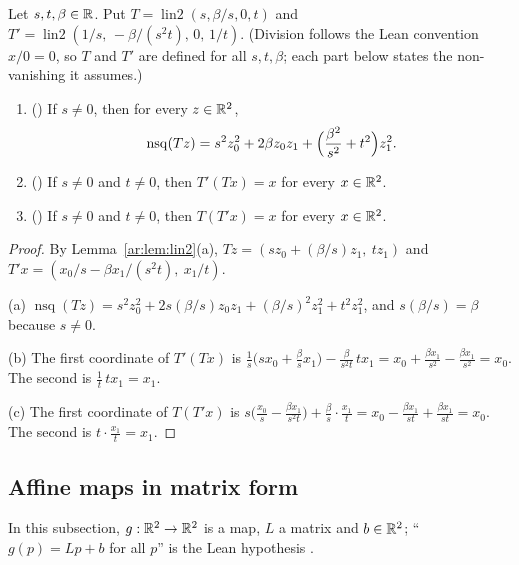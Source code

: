 \begin{lemma}\label{ar:lem:chol}
Let $s,t,\beta\in\mathbb R$. Put $T=\operatorname{lin2}(s,\beta/s,0,t)$ and $T'=\operatorname{lin2}(1/s,\,-\beta/(s^2t),\,0,\,1/t)$.
\textup(Division follows the Lean convention $x/0=0$, so $T$ and $T'$ are defined for all $s,t,\beta$; each part
below states the non-vanishing it assumes.\textup)
\begin{enumerate}[label=\textup{(\alph*)}]
\item \textup{(}\textup{)} If $s\ne0$, then for every $z\in\mathbb R^2$,
\[
\operatorname{nsq}(Tz)=s^2z_0^2+2\beta z_0z_1+\Bigl(\frac{\beta^2}{s^2}+t^2\Bigr)z_1^2 .
\]
\item \textup{(}\textup{)} If $s\ne0$ and $t\ne0$, then $T'(Tx)=x$ for every $x\in\mathbb R^2$.
\item \textup{(}\textup{)} If $s\ne0$ and $t\ne0$, then $T(T'x)=x$ for every $x\in\mathbb R^2$.
\end{enumerate}
\end{lemma}

\begin{proof}
By Lemma~\ref{ar:lem:lin2}(a), $Tz=(sz_0+(\beta/s)z_1,\ tz_1)$ and $T'x=(x_0/s-\beta x_1/(s^2t),\ x_1/t)$.

(a) $\operatorname{nsq}(Tz)=s^2z_0^2+2s(\beta/s)z_0z_1+(\beta/s)^2z_1^2+t^2z_1^2$, and $s(\beta/s)=\beta$ because
$s\ne0$.

(b) The first coordinate of $T'(Tx)$ is $\frac1s\bigl(sx_0+\frac\beta sx_1\bigr)-\frac{\beta}{s^2t}\,tx_1
=x_0+\frac{\beta x_1}{s^2}-\frac{\beta x_1}{s^2}=x_0$. The second is $\frac1t\,tx_1=x_1$.

(c) The first coordinate of $T(T'x)$ is $s\bigl(\frac{x_0}s-\frac{\beta x_1}{s^2t}\bigr)+\frac\beta s\cdot\frac{x_1}t
=x_0-\frac{\beta x_1}{st}+\frac{\beta x_1}{st}=x_0$. The second is $t\cdot\frac{x_1}t=x_1$.
\end{proof}

\subsection{Affine maps in matrix form}

In this subsection, $g:\mathbb R^2\to\mathbb R^2$ is a map, $L$ a matrix and $b\in\mathbb R^2$; ``$g(p)=Lp+b$ for all $p$'' is the Lean
hypothesis .

